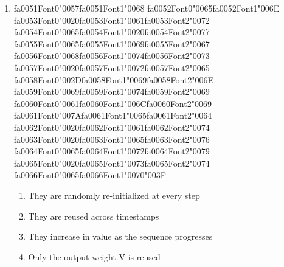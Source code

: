 \documentclass[12pt]{article}
\begin{document}
\begin{enumerate}[label=Q\arabic*.]
\item {\csname fa0051Font0\endcsname\char"0057}{\csname fa0051Font1\endcsname\char"0068} {\csname fa0052Font0\endcsname\char"0065}{\csname fa0052Font1\endcsname\char"006E} {\csname fa0053Font0\endcsname\char"0020}{\csname fa0053Font1\endcsname\char"0061}{\csname fa0053Font2\endcsname\char"0072} {\csname fa0054Font0\endcsname\char"0065}{\csname fa0054Font1\endcsname\char"0020}{\csname fa0054Font2\endcsname\char"0077} {\csname fa0055Font0\endcsname\char"0065}{\csname fa0055Font1\endcsname\char"0069}{\csname fa0055Font2\endcsname\char"0067} {\csname fa0056Font0\endcsname\char"0068}{\csname fa0056Font1\endcsname\char"0074}{\csname fa0056Font2\endcsname\char"0073} {\csname fa0057Font0\endcsname\char"0020}{\csname fa0057Font1\endcsname\char"0072}{\csname fa0057Font2\endcsname\char"0065} {\csname fa0058Font0\endcsname\char"002D}{\csname fa0058Font1\endcsname\char"0069}{\csname fa0058Font2\endcsname\char"006E} {\csname fa0059Font0\endcsname\char"0069}{\csname fa0059Font1\endcsname\char"0074}{\csname fa0059Font2\endcsname\char"0069} {\csname fa0060Font0\endcsname\char"0061}{\csname fa0060Font1\endcsname\char"006C}{\csname fa0060Font2\endcsname\char"0069} {\csname fa0061Font0\endcsname\char"007A}{\csname fa0061Font1\endcsname\char"0065}{\csname fa0061Font2\endcsname\char"0064} {\csname fa0062Font0\endcsname\char"0020}{\csname fa0062Font1\endcsname\char"0061}{\csname fa0062Font2\endcsname\char"0074} {\csname fa0063Font0\endcsname\char"0020}{\csname fa0063Font1\endcsname\char"0065}{\csname fa0063Font2\endcsname\char"0076} {\csname fa0064Font0\endcsname\char"0065}{\csname fa0064Font1\endcsname\char"0072}{\csname fa0064Font2\endcsname\char"0079} {\csname fa0065Font0\endcsname\char"0020}{\csname fa0065Font1\endcsname\char"0073}{\csname fa0065Font2\endcsname\char"0074} {\csname fa0066Font0\endcsname\char"0065}{\csname fa0066Font1\endcsname\char"0070}{\char"003F}
\begin{enumerate}[label=(\Alph*)]
    \item They are randomly re-initialized at every step
    \item They are reused across timestamps
    \item They increase in value as the sequence progresses
    \item Only the output weight V is reused
\end{enumerate}

\end{enumerate}
\end{document}
